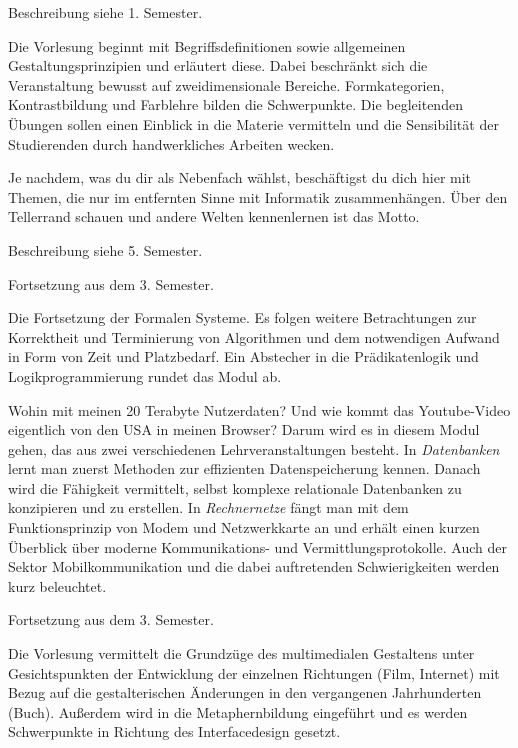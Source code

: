 Beschreibung siehe 1. Semester.

Die Vorlesung beginnt mit Begriffsdefinitionen sowie allgemeinen Gestaltungsprinzipien und erläutert diese.
Dabei beschränkt sich die Veranstaltung bewusst auf zweidimensionale Bereiche.
Formkategorien, Kontrastbildung und Farblehre bilden die Schwerpunkte.
Die begleitenden Übungen sollen einen Einblick in die Materie vermitteln und die Sensibilität der Studierenden durch handwerkliches Arbeiten wecken.

Je nachdem, was du dir als Nebenfach wählst, beschäftigst du dich hier mit Themen, die nur im entfernten Sinne mit Informatik zusammenhängen.
Über den Tellerrand schauen und andere Welten kennenlernen ist das Motto.

Beschreibung siehe 5. Semester.


Fortsetzung aus dem 3. Semester.

Die Fortsetzung der Formalen Systeme.
Es folgen weitere Betrachtungen zur Korrektheit und Terminierung von Algorithmen und dem notwendigen Aufwand in Form von Zeit und Platzbedarf.
Ein Abstecher in die Prädikatenlogik und Logikprogrammierung rundet das Modul ab.

Wohin mit meinen 20 Terabyte Nutzerdaten? Und wie kommt das Youtube-Video eigentlich von den USA in meinen Browser?
Darum wird es in diesem Modul gehen, das aus zwei verschiedenen Lehrveranstaltungen besteht.
In \textit{Datenbanken} lernt man zuerst Methoden zur effizienten Datenspeicherung kennen.
Danach wird die Fähigkeit vermittelt, selbst komplexe relationale Datenbanken zu konzipieren und zu erstellen.
In \textit{Rechnernetze} fängt man mit dem Funktionsprinzip von Modem und Netzwerkkarte an und erhält einen kurzen Überblick über moderne Kommunikations- und Vermittlungsprotokolle.
Auch der Sektor Mobilkommunikation und die dabei auftretenden Schwierigkeiten werden kurz beleuchtet.

Fortsetzung aus dem 3. Semester.

Die Vorlesung vermittelt die Grundzüge des multimedialen Gestaltens unter Gesichtspunkten der Entwicklung der einzelnen Richtungen (Film, Internet) mit Bezug auf die gestalterischen Änderungen in den vergangenen Jahrhunderten (Buch).
Außerdem wird in die Metaphernbildung eingeführt und es werden Schwerpunkte in Richtung des Interfacedesign gesetzt.

